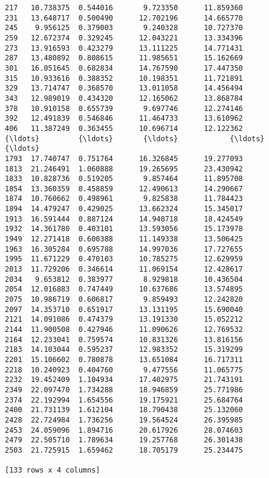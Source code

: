 \documentclass[11pt]{article}
\begin{document}
\begin{Verbatim}[commandchars=\\\{\}]
217   10.738375  0.544016       9.723350      11.859360
231   13.648717  0.500490      12.702196      14.665770
245    9.956125  0.379003       9.240328      10.727370
259   12.672374  0.329245      12.043221      13.334396
273   13.916593  0.423279      13.111225      14.771431
287   13.480892  0.808615      11.985651      15.162669
301   16.051645  0.682834      14.767590      17.447350
315   10.933616  0.388352      10.198351      11.721891
329   13.714747  0.368570      13.011058      14.456494
343   12.989019  0.434320      12.165062      13.868784
378   10.910158  0.655739       9.697746      12.274146
392   12.491839  0.546846      11.464733      13.610962
406   11.387249  0.363455      10.696714      12.122362
{\ldots}         {\ldots}       {\ldots}            {\ldots}            {\ldots}
1793  17.740747  0.751764      16.326845      19.277093
1813  21.246491  1.060888      19.265695      23.430942
1833  10.828736  0.519205       9.857464      11.895708
1854  13.360359  0.458859      12.490613      14.290667
1874  10.760662  0.498961       9.825838      11.784423
1894  14.479247  0.429025      13.662324      15.345017
1913  16.591444  0.887124      14.940718      18.424549
1932  14.361780  0.403101      13.593056      15.173978
1949  12.271418  0.600388      11.149338      13.506425
1963  16.305284  0.695788      14.997036      17.727655
1995  11.671229  0.470103      10.785275      12.629959
2013  11.729206  0.346614      11.069154      12.428617
2034   9.653812  0.383977       8.929818      10.436504
2054  12.016883  0.747449      10.637686      13.574895
2075  10.986719  0.606817       9.859493      12.242820
2097  14.353710  0.651917      13.131195      15.690040
2121  14.091086  0.474379      13.191330      15.052212
2144  11.900508  0.427946      11.090626      12.769532
2164  12.233041  0.759574      10.831326      13.816156
2183  14.103044  0.595237      12.983352      15.319299
2201  15.106602  0.780878      13.651084      16.717311
2218  10.240923  0.404760       9.477556      11.065775
2232  19.452409  1.104934      17.402975      21.743191
2349  22.097470  1.734288      18.946859      25.771986
2374  22.192994  1.654556      19.175921      25.684764
2400  21.731139  1.612104      18.790438      25.132060
2428  22.724984  1.736256      19.564524      26.395985
2453  24.059096  1.894716      20.617926      28.074603
2479  22.505710  1.789634      19.257768      26.301438
2503  21.725915  1.659462      18.705179      25.234475

[133 rows x 4 columns]

    \end{Verbatim}
\end{document}
